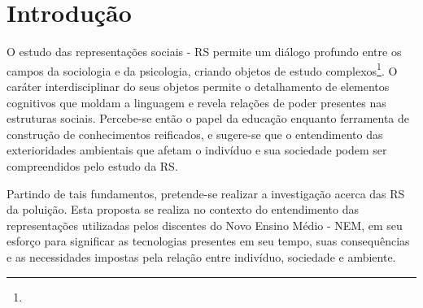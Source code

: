 \documentclass[
  12pt,       %
  openright,      %
  twoside,      %
  a4paper,      %
  english,      %
  french,       %
  spanish,      %
  brazil        %
  ]{abntex2}
\begin{document}

\tableofcontents*
\cleardoublepage



\textual

\chapter{Introdução}

O estudo das representações sociais - RS permite um diálogo profundo entre os campos da sociologia e da psicologia, criando objetos de estudo complexos\footnote{}. O caráter interdisciplinar do seus objetos permite o detalhamento de elementos cognitivos que moldam a linguagem e revela relações de poder presentes nas estruturas sociais. Percebe-se então o papel da educação enquanto ferramenta de construção de conhecimentos reificados, e sugere-se que o entendimento das exterioridades ambientais que afetam o indivíduo e sua sociedade podem ser compreendidos pelo estudo da RS.

Partindo de tais fundamentos, pretende-se realizar a investigação acerca das RS da poluição. Esta proposta se realiza no contexto do entendimento das representações utilizadas pelos discentes do Novo Ensino Médio - NEM, em seu esforço para significar as tecnologias presentes em seu tempo, suas consequências e as necessidades impostas pela relação entre indivíduo, sociedade e ambiente. 
\end{document}
